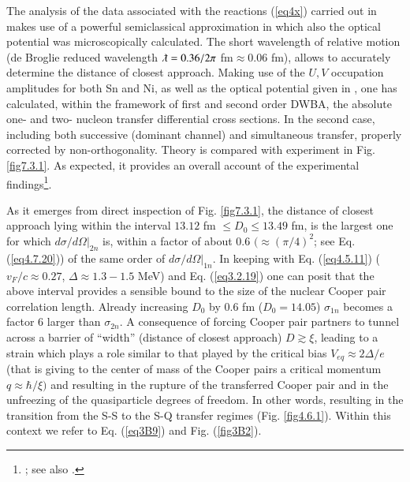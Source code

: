 The analysis of the data associated with the reactions (\ref{eq4x})  carried out in \cite{Montanari:14,Montanari:16} makes use of a powerful semiclassical approximation in which also the optical potential was microscopically calculated. The short wavelength of relative motion (de Broglie reduced wavelength $\lambdabar=0.36/2\pi$ fm$\approx0.06$ fm), allows to accurately determine the distance of closest approach. Making use of the $U,V$ occupation amplitudes for both Sn and Ni, as well as the optical potential given in \cite{Montanari:14}, one has calculated, within the framework of first and second order DWBA, the absolute one- and two- nucleon transfer differential cross sections.  In the second case, including both successive (dominant channel) and simultaneous transfer, properly corrected by non-orthogonality. Theory is compared with experiment in Fig. \ref{fig7.3.1}. As expected, it provides an overall account of the experimental findings\footnote{\cite{Potel:21}; see also \cite{Montanari:14}.}.

As it emerges from direct inspection of Fig. \ref{fig7.3.1}, the distance of closest approach lying within the interval $13.12$ fm $\leq D_0\leq13.49$ fm, is the largest one for which $d\sigma /d\Omega|_{2n}$ is, within a factor of about 0.6 $(\approx(\pi/4)^2$; see Eq. (\ref{eq4.7.20}))   of the same order of $d\sigma /d\Omega|_{1n}$. In keeping with Eq. (\ref{eq4.5.11}) ($v_F/c\approx0.27$, $\Delta\approx1.3-1.5$ MeV) and Eq. (\ref{eq3.2.19}) one can posit that the above interval provides a sensible bound to the size of the nuclear Cooper pair correlation length.  Already increasing $D_0$ by 0.6 fm ($D_0=14.05$) $\sigma_{1n}$ becomes a factor 6 larger than $\sigma_{2n}$. A consequence  of forcing Cooper pair partners to tunnel across a barrier of ``width'' (distance of closest approach) $D\gtrsim\xi$, leading to a strain which plays a role similar to that played by the critical bias $V_{eq}\approx2\Delta/e$ (that is giving to the center of mass of the Cooper pairs a critical momentum $q\approx\hbar/\xi)$ and resulting in the rupture of the transferred Cooper pair and in the unfreezing of the quasiparticle degrees of freedom. In other words, resulting in the transition from the S-S to the S-Q transfer  regimes (Fig. \ref{fig4.6.1}). Within this context we refer to Eq. (\ref{eq3B9}) and Fig. (\ref{fig3B2}).
 
